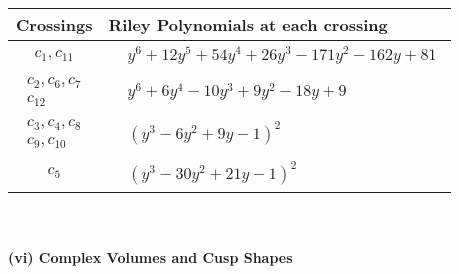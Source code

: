\documentclass[1p]{elsarticle_modified}
\theoremstyle{definition}
\begin{document}
\begin{tabular}{m{50pt}|m{274pt}}
Crossings & \hspace{64pt}Riley Polynomials at each crossing \\
\hline $$\begin{aligned}c_{1},c_{11}\end{aligned}$$&$\begin{aligned}
&y^6+12 y^5+54 y^4+26 y^3-171 y^2-162 y+81
\end{aligned}$\\
\hline $$\begin{aligned}c_{2},c_{6},c_{7}\\c_{12}\end{aligned}$$&$\begin{aligned}
&y^6+6 y^4-10 y^3+9 y^2-18 y+9
\end{aligned}$\\
\hline $$\begin{aligned}c_{3},c_{4},c_{8}\\c_{9},c_{10}\end{aligned}$$&$\begin{aligned}
&(y^3-6 y^2+9 y-1)^2
\end{aligned}$\\
\hline $$\begin{aligned}c_{5}\end{aligned}$$&$\begin{aligned}
&(y^3-30 y^2+21 y-1)^2
\end{aligned}$\\
\hline
\end{tabular}\\~\\
\newpage\flushleft \textbf{(vi) Complex Volumes and Cusp Shapes}
\end{document}
